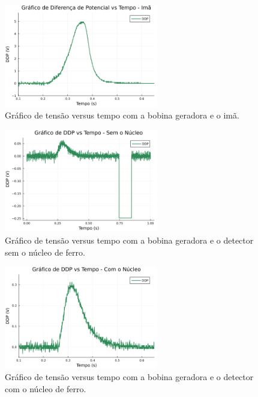 \documentclass[column,brazilian,12pt,a4paper,final]{article}
\begin{document}
\begin{figure}[!htb]
    \centering
    \includegraphics[width=0.6\textwidth]{figuras/grafico_diferenca_potencial - 1.png}
    \caption{Gráfico de tensão versus tempo com a bobina geradora e o imã.}
    \label{fig:grafico1}
\end{figure}
\begin{figure}[!htb]
    \centering
    \includegraphics[width=0.6\textwidth]{figuras/grafico_diferenca_potencial - 2.png}
    \caption{Gráfico de tensão versus tempo com a bobina geradora e o detector sem o núcleo de ferro.}
    \label{fig:grafico2}
\end{figure}
\begin{figure}[!htb]
    \centering
    \includegraphics[width=0.6\textwidth]{figuras/grafico_diferenca_potencial - 3.png}
    \caption{Gráfico de tensão versus tempo com a bobina geradora e o detector com o núcleo de ferro.}
    \label{fig:grafico3}
\end{figure}
\newpage
\end{document}
